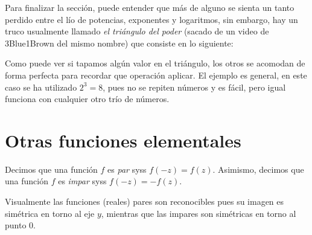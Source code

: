 \documentclass[11pt,oneside,a4paper]{book}
\begin{document}
Para finalizar la sección, puede entender que más de alguno se sienta un tanto perdido entre el lío de potencias, exponentes y logaritmos, sin embargo, hay un truco usualmente llamado \textit{el triángulo del poder} (sacado de un video de 3Blue1Brown del mismo nombre) que consiste en lo siguiente:
\begin{figure}
\centering
{}
\caption{}
\end{figure}

Como puede ver si tapamos algún valor en el triángulo, los otros se acomodan de forma perfecta para recordar que operación aplicar. El ejemplo es general, en este caso se ha utilizado $2^3=8$, pues no se repiten números y es fácil, pero igual funciona con cualquier otro trío de números.

\section{Otras funciones elementales}
\begin{mydef}
Decimos que una función $f$ es \textit{par} syss $f(-z)=f(z)$. Asimismo, decimos que una función $f$ es \textit{impar} syss $f(-z)=-f(z)$.
\end{mydef}
Visualmente las funciones (reales) pares son reconocibles pues su imagen es simétrica en torno al eje $y$, mientras que las impares son simétricas en torno al punto 0.
\end{document}
